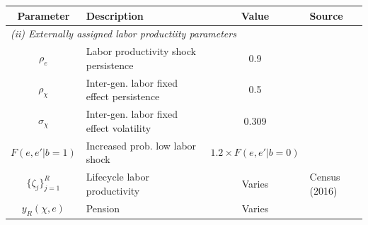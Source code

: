 \begin{table}[p]
\footnotesize
\renewcommand{\arraystretch}{1.2}
\begin{center}
\begin{tabular}{clcl}\toprule
Parameter & Description & Value & Source\\
\midrule
\multicolumn{4}{l}{\textit{(ii) Externally assigned labor productiity parameters}}\\
\midrule
$\rho_{e}$ & Labor productivity shock persistence & 0.9 & \citet{gkkoc} \\
$\rho_{\chi}$ & Inter-gen. labor fixed effect persistence  & 0.5 & \citet{gkkoc} \\
$\sigma_{\chi}$ & Inter-gen. labor fixed effect volatility & 0.309 & \citet{gkkoc} \\
$F(e,e'|b=1)$ & Increased prob. low labor shock & $1.2\times F(e,e'|b=0)$ & \citet{az-2024} \\
$\{\zeta_j\}_{j=1}^{R}$ & Lifecycle labor productivity & Varies & Census (2016) \\
$y_{R}(\chi,e)$ & Pension &  Varies & \citet{OECD-pension}\\
\bottomrule
\bottomrule
\end{tabular}
\end{center}
\normalsize
\end{table}
